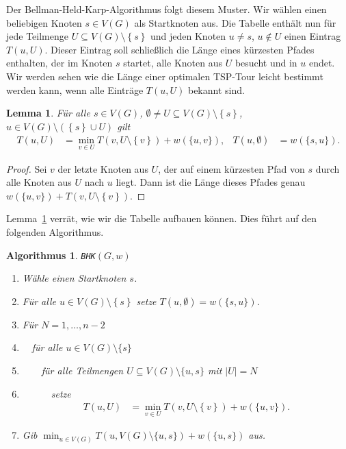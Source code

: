 \documentclass[10pt,reqno]{amsart}
\numberwithin{equation}{section}
\newtheorem{lemma}[definition]{Lemma}
\newtheorem{algorithm}[definition]{Algorithmus}
\newcommand\cbc[1]{\left\{{#1}\right\}}
\newcommand\Lem{Lemma}
\begin{document}
Der Bellman-Held-Karp-Algorithmus folgt diesem Muster.
Wir w\"ahlen einen beliebigen Knoten $s\in V(G)$ als Startknoten aus.
Die Tabelle enth\"alt nun f\"ur jede Teilmenge $U\subseteq V(G)\setminus\cbc s$ und jeden Knoten $u\neq s$, $u\not\in U$ einen Eintrag $T(u,U)$.
Dieser Eintrag soll schlie\ss lich die L\"ange eines k\"urzesten Pfades enthalten, der im Knoten $s$ startet, alle Knoten aus $U$ besucht und in $u$ endet.
Wir werden sehen wie die L\"ange einer optimalen TSP-Tour leicht bestimmt werden kann, wenn alle Eintr\"age $T(u,U)$ bekannt sind.

\begin{lemma}\label{lemma_tsp}
	F\"ur alle $s\in V(G)$, $\emptyset\neq U\subseteq V(G)\setminus\cbc s$, $u\in V(G)\setminus(\cbc s\cup U)$ gilt
	\begin{align*}
		T(u,U)&=\min_{v\in U}T(v,U\setminus\cbc v)+w(\{u,v\}),&T(u,\emptyset)&=w(\{s,u\}).
	\end{align*}
\end{lemma}
\begin{proof}
	Sei $v$ der letzte Knoten aus $U$, der auf einem k\"urzesten Pfad von $s$ durch alle Knoten aus $U$ nach $u$ liegt.
	Dann ist die L\"ange dieses Pfades genau $w(\{u,v\})+T(v,U\setminus\cbc v)$.
\end{proof}

\Lem~\ref{lemma_tsp} verr\"at, wie wir die Tabelle aufbauen k\"onnen.
Dies f\"uhrt auf den folgenden Algorithmus.

\begin{algorithm}{\tt BHK}$(G,w)$
	\begin{enumerate}
		\item W\"ahle einen Startknoten $s$.
		\item F\"ur alle $u\in V(G)\setminus\cbc s$ setze $T(u,\emptyset)=w(\{s,u\})$.
		\item F\"ur $N=1,\ldots,n-2$
		\item $\quad$f\"ur alle $u\in V(G)\setminus\{s\}$
		\item $\quad\quad$f\"ur alle Teilmengen $U\subseteq V(G)\setminus\{u,s\}$ mit $|U|=N$
		\item $\quad\quad\quad$setze
\begin{align*}
		T(u,U)&=\min_{v\in U}T(v,U\setminus\cbc v)+w(\{u,v\}).
	\end{align*}
\item Gib $\min_{u\in V(G)}T(u,V(G)\setminus\{u,s\})+w(\{u,s\})$ aus.
	\end{enumerate}
\end{algorithm}
\end{document}
